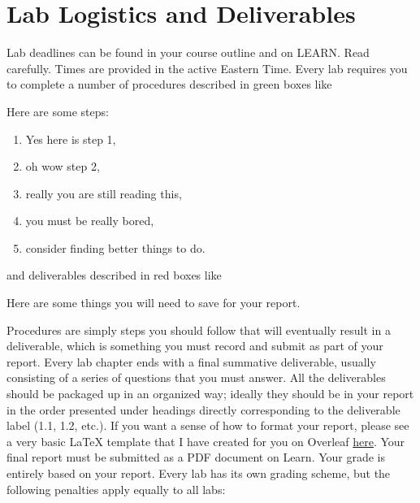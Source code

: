 \section{Lab Logistics and Deliverables}\label{intro:logistics}
Lab deadlines can be found in your course outline and on LEARN.
Read carefully.
Times are provided in the active Eastern Time.
Every lab requires you to complete a number of procedures described in green boxes like
\begin{procedure}[]
  Here are some steps:
  \begin{enumerate}[label=(\arabic*)]
    \item{Yes here is step 1,}
    \item{oh wow step 2,}
    \item{really you are still reading this,}
    \item{you must be really bored,}
    \item{consider finding better things to do.}
  \end{enumerate}
\end{procedure}
\noindent
and deliverables described in red boxes like
\begin{deliverable}[]
  Here are some things you will need to save for your report.
\end{deliverable}
Procedures are simply steps you should follow that will eventually result in a deliverable, which is something you must record and submit as part of your report.
Every lab chapter ends with a final summative deliverable, usually
consisting of a series of questions that you must answer.
%
All the deliverables should be packaged up in an organized way; ideally
they should be in your report in the order presented under headings directly
corresponding to the deliverable label (1.1, 1.2, etc.). If you want a sense
of how to format your report, please see a very basic LaTeX template that I
have created for you on Overleaf \href{https://www.overleaf.com/read/jnwwfmnvkgpx}{here}.
Your final report must be submitted as a PDF document on Learn.
Your grade is entirely based on your report.
Every lab has its own grading scheme, but the following penalties apply equally to all labs:
